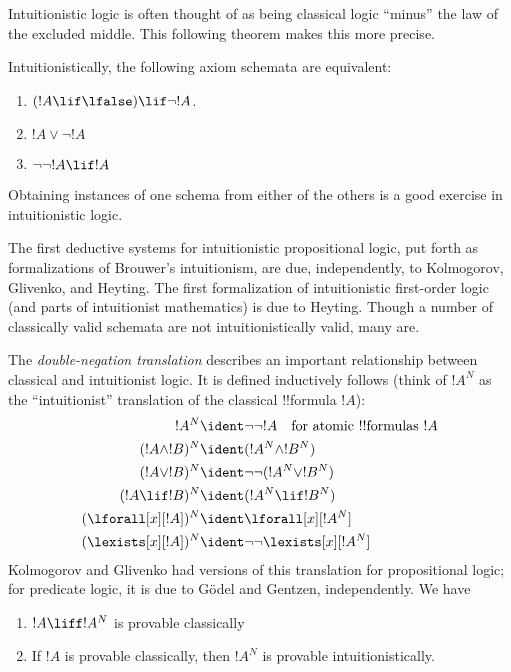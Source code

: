 \documentclass[../../include/open-logic-section]{subfiles}
\begin{document}
Intuitionistic logic is often thought of as being classical logic
``minus'' the law of the excluded middle. This following theorem makes
this more precise.
\begin{thm}
Intuitionistically, the following axiom schemata are equivalent:
\begin{enumerate}
\item $(!A \lif \lfalse) \lif \lnot !A$.
\item $!A \lor \lnot !A$
\item $\lnot \lnot !A \lif !A$
\end{enumerate}
\end{thm}
Obtaining instances of one schema from either of the others is a good
exercise in intuitionistic logic.

The first deductive systems for intuitionistic propositional
logic, put forth as formalizations of Brouwer's intuitionism, are due,
independently, to Kolmogorov, Glivenko, and Heyting. The first
formalization of intuitionistic first-order logic (and parts of
intuitionist mathematics) is due to Heyting. Though a number of
classically valid schemata are not intuitionistically valid, many are.

The \emph{double-negation translation} describes an important
relationship between classical and intuitionist logic. It is defined
inductively follows (think of $!A^N$ as the ``intuitionist''
translation of the classical !!{formula} $!A$):
\begin{align*}
!A^N & \ident \lnot\lnot !A \quad \text{for atomic !!{formula}s $!A$} \\
(!A \land !B)^N & \ident (!A^N \land !B^N) \\
(!A \lor !B)^N & \ident  \lnot\lnot (!A^N \lor !B^N) \\
(!A \lif !B)^N & \ident (!A^N \lif !B^N) \\
(\lforall[x][!A])^N & \ident \lforall[x][!A^N] \\
(\lexists[x][!A])^N & \ident \lnot\lnot\lexists[x][!A^N]
\end{align*}
Kolmogorov and Glivenko had versions of this translation for
propositional logic; for predicate logic, it is due to G\"odel and
Gentzen, independently. We have

\begin{thm}
\begin{enumerate}
\item $!A \liff !A^N$ is provable classically
\item If $!A$ is provable classically, then $!A^N$ is provable
  intuitionistically.
\end{enumerate}
\end{thm}
\end{document}
